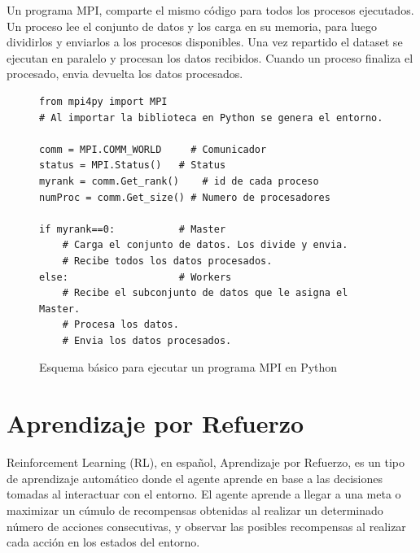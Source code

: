 Un programa MPI, comparte el mismo código para todos los procesos ejecutados. Un proceso lee el conjunto de datos y los carga en su memoria, para luego dividirlos y enviarlos a los procesos disponibles. Una vez repartido el dataset se ejecutan en paralelo y procesan los datos recibidos. Cuando un proceso finaliza el procesado, envia devuelta los datos procesados.

\begin{figure}[!h]
	
	\begin{lstlisting}[frame=single]
from mpi4py import MPI 
# Al importar la biblioteca en Python se genera el entorno.

comm = MPI.COMM_WORLD     # Comunicador
status = MPI.Status()   # Status
myrank = comm.Get_rank() 	# id de cada proceso
numProc = comm.Get_size() # Numero de procesadores

if myrank==0:           # Master
    # Carga el conjunto de datos. Los divide y envia.
    # Recibe todos los datos procesados.
else:                   # Workers
    # Recibe el subconjunto de datos que le asigna el Master.
    # Procesa los datos.
    # Envia los datos procesados.
	\end{lstlisting}
	\caption{Esquema básico para ejecutar un programa MPI en Python}
	\label{fig:esquea_mpi}
\end{figure}

\newpage

\section{Aprendizaje por Refuerzo}

Reinforcement Learning (RL), en español, Aprendizaje por Refuerzo, es un tipo de aprendizaje automático donde el agente aprende en base a las decisiones tomadas al interactuar con el entorno. El agente aprende a llegar a una meta o maximizar un cúmulo de recompensas obtenidas al realizar un determinado número de acciones consecutivas, y observar las posibles recompensas al realizar cada acción en los estados del entorno.

